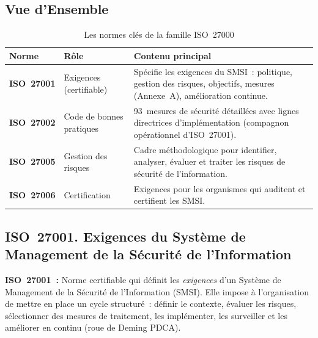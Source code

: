 \subsection{Vue d'Ensemble}
\label{subsec:iso27000-vue}

\begin{table}[h!]
\centering
\small
\renewcommand{\arraystretch}{1.4}
\begin{tabular}{|p{2.4cm}|p{3.2cm}|p{6.4cm}|}
    \hline
    \rowcolor{blue!10}
    \textbf{Norme} & \textbf{Rôle} & \textbf{Contenu principal} \\ \hline
    \textbf{ISO~27001} & Exigences (certifiable) &
        Spécifie les exigences du SMSI~: politique, gestion des risques, objectifs,
        mesures (Annexe~A), amélioration continue. \\ \hline
    \textbf{ISO~27002} & Code de bonnes pratiques &
        93~mesures de sécurité détaillées avec lignes directrices d'implémentation
        (compagnon opérationnel d'ISO~27001). \\ \hline
    \textbf{ISO~27005} & Gestion des risques &
        Cadre méthodologique pour identifier, analyser, évaluer et traiter les risques
        de sécurité de l'information. \\ \hline
    \textbf{ISO~27006} & Certification &
        Exigences pour les organismes qui auditent et certifient les SMSI. \\ \hline
\end{tabular}
\caption{Les normes clés de la famille ISO~27000}
\end{table}

\subsection{ISO~27001. Exigences du Système de Management de la Sécurité de l'Information}
\label{subsec:iso27001}

\begin{boxdef}
\textbf{ISO~27001~:} Norme certifiable qui définit les \emph{exigences} d'un Système
de Management de la Sécurité de l'Information (SMSI). Elle impose à l'organisation de
mettre en place un cycle structuré~: définir le contexte, évaluer les risques, sélectionner
des mesures de traitement, les implémenter, les surveiller et les améliorer en continu
(roue de Deming PDCA).
\end{boxdef}

